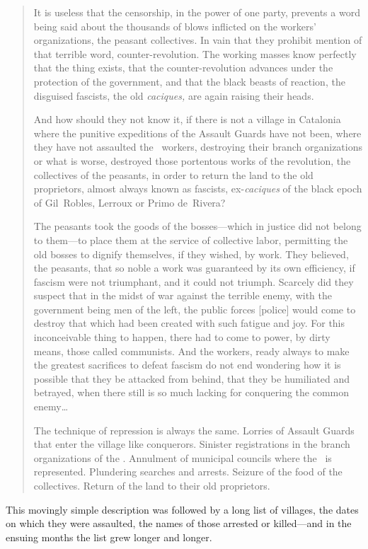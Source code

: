 \begin{quotation}
  It is useless that the censorship, in the power of one party, prevents a word being said about the thousands of blows inflicted on the workers’ organizations, the peasant collectives. In vain that they prohibit mention of that terrible word, counter-revolution. The working masses know perfectly that the thing exists, that the counter-revolution advances under the protection of the government, and that the black beasts of reaction, the disguised fascists, the old \emph{caciques,} are again raising their heads.
  
  And how should they not know it, if there is not a village in Catalonia where the punitive expeditions of the Assault Guards have not been, where they have not assaulted the \CNT\ workers, destroying their branch organizations or what is worse, destroyed those portentous works of the revolution, the collectives of the peasants, in order to return the land to the old proprietors, almost always known as fascists, ex-\emph{caciques} of the black epoch of Gil~Robles, Lerroux or Primo de~Rivera?
  
  The peasants took the goods of the bosses---which in justice did not belong to them---to place them at the service of collective labor, permitting the old bosses to dignify themselves, if they wished, by work. They believed, the peasants, that so noble a work was guaranteed by its own efficiency, if fascism were not triumphant, and it could not triumph. Scarcely did they suspect that in the midst of war against the terrible enemy, with the government being men of the left, the public forces [police] would come to destroy that which had been created with such fatigue and joy. For this inconceivable thing to happen, there had to come to power, by dirty means, those called communists. And the workers, ready always to make the greatest sacrifices to defeat fascism do not end wondering how it is possible that they be attacked from behind, that they be humiliated and betrayed, when there still is so much lacking for conquering the common enemy\dots
  
  The technique of repression is always the same. Lorries of Assault Guards that enter the village like conquerors. Sinister registrations in the branch organizations of the \CNT. Annulment of municipal councils where the \CNT\ is represented. Plundering searches and arrests. Seizure of the food of the collectives. Return of the land to their old proprietors.
\end{quotation}

This movingly simple description was followed by a long list of villages, the dates on which they were assaulted, the names of those arrested or killed---and in the ensuing months the list grew longer and longer.

